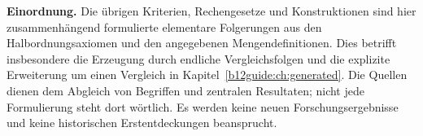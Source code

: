 \begingroup
\footnotesize
\noindent\textbf{Einordnung.}
Die übrigen Kriterien, Rechengesetze und Konstruktionen sind
hier zusammenhängend formulierte elementare Folgerungen aus
den Halbordnungsaxiomen und den angegebenen Mengendefinitionen.
Dies betrifft insbesondere die Erzeugung durch endliche
Vergleichsfolgen und die explizite Erweiterung um einen Vergleich
in Kapitel~\ref{b12guide:ch:generated}.
Die Quellen dienen dem Abgleich von Begriffen und zentralen
Resultaten; nicht jede Formulierung steht dort wörtlich.
Es werden keine neuen Forschungsergebnisse und keine historischen
Erstentdeckungen beansprucht.
\endgroup
